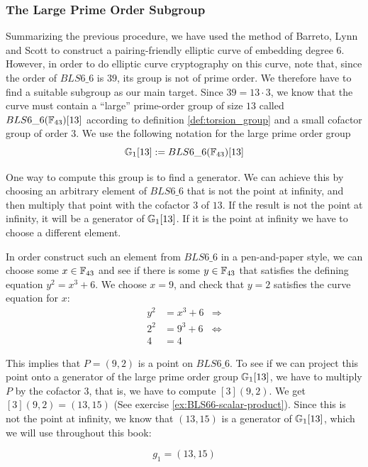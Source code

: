 \subsubsection{The Large Prime Order Subgroup}
Summarizing the previous procedure, we have used the method of Barreto, Lynn and Scott to construct a pairing-friendly elliptic curve of embedding degree $6$. However, in order to do elliptic curve cryptography on this curve, note that, since the order of $BLS6\_6$ is $39$, its group is not of prime order. We therefore have to find a suitable subgroup as our main target. Since $39=13\cdot 3$, we know that the curve must contain a ``large'' prime-order group of size $13$ called $BLS6\_6(\mathbb{F}_{43})[13]$ according to definition \ref{def:torsion_group} and a small cofactor group of order $3$. We use the following notation for the large prime order group
\begin{equation}
\label{def:BLS6613}
\mathbb{G}_1[13]:= BLS6\_6(\mathbb{F}_{43})[13]
\end{equation}

One way to compute this group is to find a generator. We can achieve this by choosing an arbitrary element of $BLS6\_6$ that is not the point at infinity, and then multiply that point with the cofactor $3$ of $13$. If the result is not the point at infinity, it will be a generator of $\mathbb{G}_1[13]$. If it is the point at infinity we have to choose a different element. 

In order construct such an element from $BLS6\_6$ in a pen-and-paper style, we can choose some $x\in\mathbb{F}_{43}$ and see if there is some $y\in\mathbb{F}_{43}$ that satisfies the defining  equation $y^2 = x^3 + 6$. We choose $x=9$, and check that $y=2$ satisfies the curve equation for $x$:
\begin{align*}
y^2 & = x^3 + 6 & \Rightarrow \\
2^2 & = 9^3 + 6 & \Leftrightarrow \\
4 & = 4
\end{align*}   

This implies that $P=(9,2)$ is a point on $BLS6\_6$. To see if we can project this point onto a generator of the large prime order group $\mathbb{G}_1[13]$, we have to multiply $P$ by the cofactor $3$, that is, we have to compute $[3](9,2)$. We get $[3](9,2) = (13,15)$ (See exercise \ref{ex:BLS66-scalar-product}). Since this is not the point at infinity, we know that $(13,15)$ is a generator of $\mathbb{G}_1[13]$, which we will use throughout this book: 

\begin{equation}\label{gBLS6-6-13}
g_{1} = (13,15)
\end{equation}


